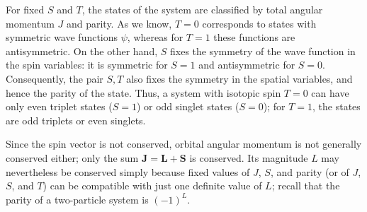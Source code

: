 For fixed $S$ and $T$, the states of the system are classified by total angular momentum $J$ and parity.
As we know, $T=0$ corresponds to states with symmetric wave functions $\psi$, whereas for $T=1$ these functions are antisymmetric.
On the other hand, $S$ fixes the symmetry of the wave function in the spin variables: it is symmetric for $S=1$ and antisymmetric for $S=0$.
Consequently, the pair $S,T$ also fixes the symmetry in the spatial variables, and hence the parity of the state.
Thus, a system with isotopic spin $T=0$ can have only even triplet states ($S=1$) or odd singlet states ($S=0$); for $T=1$, the states are odd triplets or even singlets.

Since the spin vector is not conserved, orbital angular momentum is not generally conserved either; only the sum $\mathbf J=\mathbf L+\mathbf S$ is conserved.
Its magnitude $L$ may nevertheless be conserved simply because fixed values of $J$, $S$, and parity (or of $J$, $S$, and $T$) can be compatible with just one definite value of $L$; recall that the parity of a two-particle system is $(-1)^L$.

